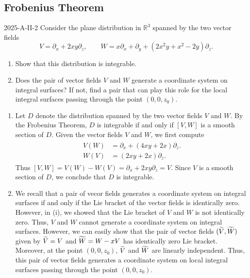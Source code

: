 \documentclass{article}
\begin{document}
	\subsection{Frobenius Theorem}
	\begin{prb}{2025-A-II-2}
		Consider the plane distribution in $\mathbb{R}^{3}$ spanned by the two vector fields 
		\begin{equation*}
			V = \partial_{x} + 2xy\partial_{z}, \qquad W = x\partial_{x} + \partial_{y}  + (2x^{2}y + x^{2} - 2y)\partial_{z}. 
		\end{equation*}
		\begin{enumerate}[itemsep =-2pt,label = (\roman{*})]
			\item Show that this distribution is integrable. 
			\item Does the pair of vector fields $V$ and $W$ generate a coordinate system on integral surfaces? If not, find a pair that can play this role for the local integral surfaces passing through the point $(0,0,z_{0})$. 
		\end{enumerate}
	\end{prb}
	\begin{enumerate}[itemsep =-2pt, label = (\roman{*})]
		\item Let $D$ denote the distribution spanned by the two vector fields $V$ and $W$. By the Frobenius Theorem, $D$ is integrable if and only if $[V, W]$ is a smooth section of $D$. Given the vector fields $V$ and $W$, we first compute 
		\begin{align*}
			\begin{split}
				V(W) &= \partial_{x} + (4xy + 2x)\partial_{z}. \\
				W(V) &= (2xy + 2x)\partial_{z}. 
			\end{split}
		\end{align*}
		Thus $[V, W] = V(W) - W(V) = \partial_{x} + 2xy\partial_{z} = V$. Since $V$ is a smooth section of $D$, we conclude that $D$ is integrable. 
		\item We recall that a pair of vecor fields generates a coordinate system on integral surfaces if and only if the Lie bracket of the vector fields is identically zero. However, in (i), we showed that the Lie bracket of $V$ and $W$ is not identically zero. Thus, $V$ and $W$ cannot generate a coordinate system on integral surfaces. However, we can easily show that the pair of vector fields $(\widetilde{V}, \widetilde{W})$ given by $\widetilde{V} = V$ and $\widetilde{W} = W - xV$ has identically zero Lie bracket. Moreover, at the point $(0,0,z_{0})$, $\widetilde{V}$ and $\widetilde{W}$ are linearly independent. Thus, this pair of vector fields generates a coordinate system on local integral surfaces passing through the point $(0,0,z_{0})$.
	\end{enumerate}
	
\end{document}
